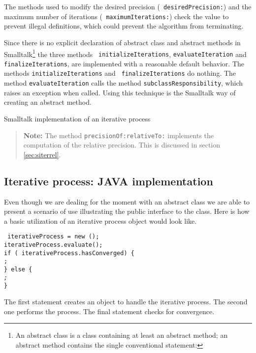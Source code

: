 \documentclass[twoside]{book}
\begin{document}
The methods used to modify the desired precision ({\tt
desiredPrecision:}) and the maximum number of iterations ({\tt
maximumIterations:}) check the value to prevent illegal
definitions, which could prevent the algorithm from terminating.

Since there is no explicit declaration of abstract class and
abstract methods in Smalltalk\footnote{An abstract class is a
class containing at least an abstract method; an abstract method
contains the single conventional statement: \hfil\break{}} the three methods {\tt
initializeIterations}, {\tt evaluateIteration} and {\tt
finalizeIterations}, are implemented with a reasonable default
behavior. The methods {\tt initializeIterations} and {\tt
finalizeIterations} do nothing. The method {\tt evaluateIteration}
calls the method {\tt subclassResponsibility}, which raises an
exception when called. Using this technique is the Smalltalk way
of creating an abstract method.
\begin{listing} Smalltalk implementation of an iterative process
\label{ls:iteration}

\end{listing}
\begin{quote}
{\bf Note:} The method {\tt precisionOf:relativeTo:} implements
the computation of the relative precision. This is discussed in
section \ref{sec:siterrel}.
\end{quote}

\subsection{Iterative process: JAVA implementation}
\label{sec:jiteration}
Even though we are dealing for the moment
with an abstract class we are able to present a scenario of use
illustrating the public interface to the class. Here is how a
basic utilization of an iterative process object would look like.
\begin{codeExample}\break
{\tt {\sl <a subclass of IterativeProcess>} iterativeProcess = new
{\sl <a subclass of IterativeProcess>}();\\
iterativeProcess.evaluate();\\ if ( iterativeProcess.hasConverged)
\{\\
    {\sl <retrieve the result>};\\
\} else \{\\
    {\sl < special case processing >;}\\
\} }
\end{codeExample}
The first statement creates an object to handle the iterative
process. The second one performs the process. The final statement
checks for convergence.
\end{document}
